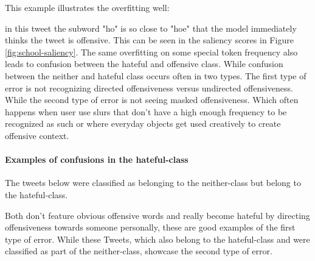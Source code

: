 \documentclass[11pt,a4paper]{article}
\begin{document}
This example illustrates the overfitting well:
\begin{center}
  \newline
\end{center}

in this tweet the subword "ho" is so close to "hoe" that the model immediately thinks the tweet is offensive.
This can be seen in the saliency scores in Figure \ref{fig:school-saliency}.
The same overfitting on some special token frequency also leads to confusion between the hateful and offensive class.
While confusion between the neither and hateful class occurs often in two types.
The first type of error is not recognizing directed offensiveness versus undirected offensiveness.
While the second type of error is not seeing masked offensiveness.
Which often happens when user use slurs that don't have a high enough frequency to be recognized as such 
or where everyday objects get used creatively to create offensive context.

\paragraph{Examples of confusions in the hateful-class}
The tweets below were classified as belonging to the neither-class but belong to the hateful-class.

\begin{center}
  \newline
  \newline
\end{center}

Both don't feature obvious offensive words and really become hateful by directing offensiveness towards someone personally, 
these are good examples of the first type of error.
While these Tweets, which also belong to the hateful-class and were classified as part of the neither-class, showcase the second type of error.
\begin{center}
  \newline
   \newline
   \newline
\end{center}
\end{document}
